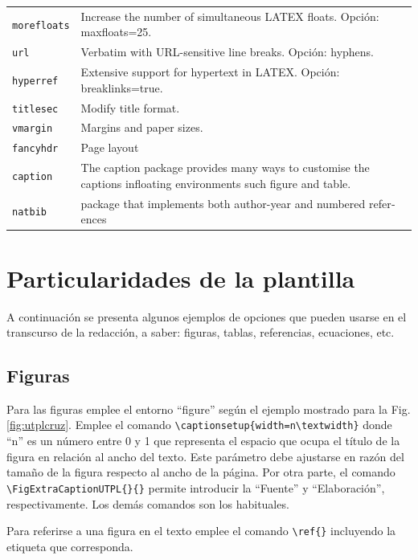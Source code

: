 \begin{longtable}{p{} p{}}
	\texttt{morefloats} & Increase the number of simultaneous LATEX floats. Opción: maxfloats=25. \\
	\texttt{url} 		& Verbatim with URL-sensitive line breaks. Opción: hyphens. \\
	\texttt{hyperref} 	& Extensive support for hypertext in LATEX. Opción: breaklinks=true. \\
	\texttt{titlesec} 	& Modify title format. \\
	\texttt{vmargin} 	& Margins and paper sizes. \\
	\texttt{fancyhdr} 	& Page layout  \\
	\texttt{caption} 	& The caption package provides many ways to customise the captions infloating environments such figure and table.\\
	\texttt{natbib} 	& pack­age that im­ple­ments both au­thor-year and num­bered ref­er­ences
\end{longtable} 


\section{Particularidades de la plantilla}

A continuación se presenta algunos ejemplos de opciones que pueden usarse en el transcurso de la redacción, a saber: figuras, tablas, referencias, ecuaciones, etc. 

\subsection{Figuras}

Para las figuras emplee el entorno ``figure'' según el ejemplo mostrado para la Fig. \ref{fig:utplcruz}. Emplee el comando \lstinline|\captionsetup{width=n\textwidth}| donde ``n'' es un número entre 0 y 1 que representa el espacio que ocupa el título de la figura en relación al ancho del texto. Este parámetro debe ajustarse en razón del tamaño de la figura respecto al ancho de la página. Por otra parte, el comando \lstinline|\FigExtraCaptionUTPL{}{}| permite introducir la ``Fuente'' y ``Elaboración'', respectivamente. Los demás comandos son los habituales. 

Para referirse a una figura en el texto emplee el comando \lstinline|\ref{}| incluyendo la etiqueta que corresponda. 

